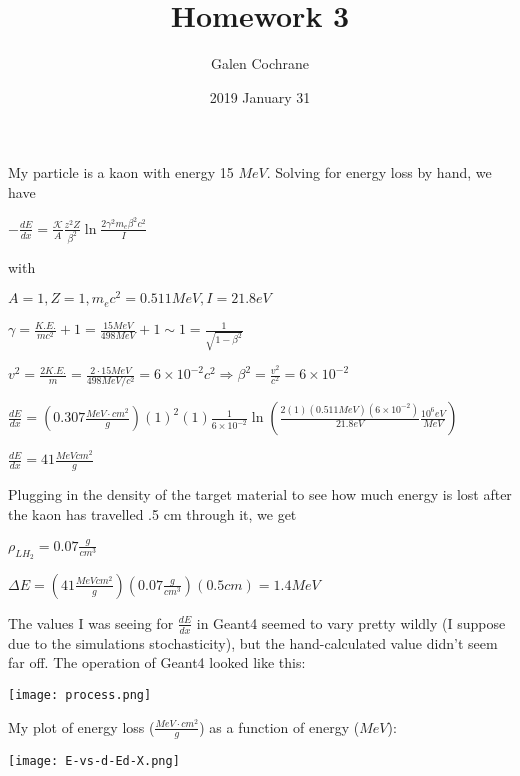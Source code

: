 \documentclass[12pt]{article}
\title{Homework 3}
\author{Galen Cochrane}
\date{2019 January 31}
\begin{document}
\maketitle

My particle is a kaon with energy 15 $MeV$.
Solving for energy loss by hand, we have

\begin{center}
$-\frac{dE}{dx}= \frac{\mathcal{K} }{A} \frac{z^2 Z}{\beta^2} \ln \frac{2 \gamma^2 m_e \beta^2 c^2}{I}$
\end{center}

\begin{center}
with
\end{center}

\begin{center}
${A}=1, {Z}=1, {m_e c^2}=0.511{MeV}, {I}=21.8{eV}$
\end{center}

\begin{center}
$\gamma = \frac{K.E.}{mc^2} + 1 = \frac{15 MeV}{498 MeV} + 1 \sim 1 = \frac{1}{\sqrt{1-\beta^2}}$
\end{center}

\begin{center}
$v^2 = \frac{2 K.E.}{m} = \frac{2 \cdot 15 MeV}{498 MeV/c^2} = 6 \times 10^{-2} c^2 \Rightarrow \beta^2 = \frac{v^2}{c^2} = 6\times 10^{-2}$
\end{center}

\begin{center}
$\frac{dE}{dx} = \left ( 0.307 \frac{MeV \cdot cm^2}{g}\right ) (1)^2 (1) \frac{1}{6 \times10^{-2}} \ln \left( \frac{2 (1) (0.511 MeV) (6 \times10^{-2})}{21.8 eV} \frac{10^6 eV}{MeV}\right)$
\end{center}

\begin{center}
$\frac{dE}{dx} = 41\frac{MeV cm^2}{g}$
\end{center}

Plugging in the density of the target material to see how much energy is lost after the kaon has travelled .5 cm through it, we get

\begin{center}
$\rho_{LH_2} = 0.07 \frac{g}{cm^3}$
\end{center}

\begin{center}
$\Delta E = (41 \frac{MeV cm^2}{g}) (0.07 \frac{g}{cm^3}) (0.5 cm) = 1.4{MeV}$
\end{center}

The values I was seeing for $\frac{dE}{dx}$ in Geant4 seemed to vary pretty wildly (I suppose due to the simulations stochasticity), but the hand-calculated value didn't seem far off.
The operation of Geant4 looked like this:

\texttt{[image: process.png]}

My plot of energy loss ($\frac{{MeV}\cdot{cm^{2}}}{g}$) as a function of energy ($MeV$):

\texttt{[image: E-vs-d-Ed-X.png]}
\end{document}
